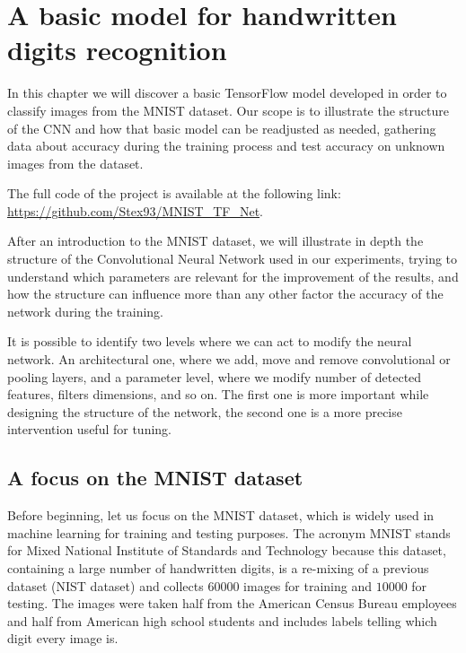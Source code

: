 \chapter{A basic model for handwritten digits recognition}\label{ch:basic_tf_model}

In this chapter we will discover a basic TensorFlow model developed in order to classify images from the \acs{MNIST} dataset. Our scope is to illustrate the structure of the \acs{CNN} and how that basic model can be readjusted as needed, gathering data about accuracy during the training process and test accuracy on unknown images from the dataset.

The full code of the project is available at the following link: \href{https://github.com/Stex93/MNIST_TF_Net}{https://github.com/Stex93/MNIST_TF_Net}.

After an introduction to the \acs{MNIST} dataset, we will illustrate in depth the structure of the Convolutional Neural Network used in our experiments, trying to understand which parameters are relevant for the improvement of the results, and how the structure can influence more than any other factor the accuracy of the network during the training.

It is possible to identify two levels where we can act to modify the neural network. An architectural one, where we add, move and remove convolutional or pooling layers, and a parameter level, where we modify number of detected features, filters dimensions, and so on. The first one is more important while designing the structure of the network, the second one is a more precise intervention useful for tuning.

\section{A focus on the MNIST dataset}

Before beginning, let us focus on the \acs{MNIST} dataset, which is widely used in machine learning for training and testing purposes. The acronym \acs{MNIST} stands for Mixed National Institute of Standards and Technology because this dataset, containing a large number of handwritten digits, is a re-mixing of a previous dataset (NIST dataset) and collects $60000$ images for training and $10000$ for testing. The images were taken half from the American Census Bureau employees and half from American high school students and includes labels telling which digit every image is.

